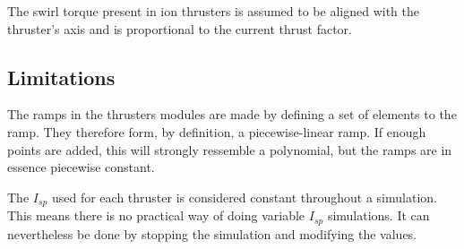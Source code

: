 The swirl torque present in ion thrusters is assumed to be aligned with the thruster's axis and is proportional to the current thrust factor.

\subsection{Limitations}

The ramps in the thrusters modules are made by defining a set of elements to the ramp. They therefore form, by definition, a piecewise-linear ramp. If enough points are added, this will strongly ressemble a polynomial, but the ramps are in essence piecewise constant.

The $I_{sp}$ used for each thruster is considered constant throughout a simulation. This means there is no practical way of doing variable $I_{sp}$ simulations. It can nevertheless be done by stopping the simulation and modifying the values.

